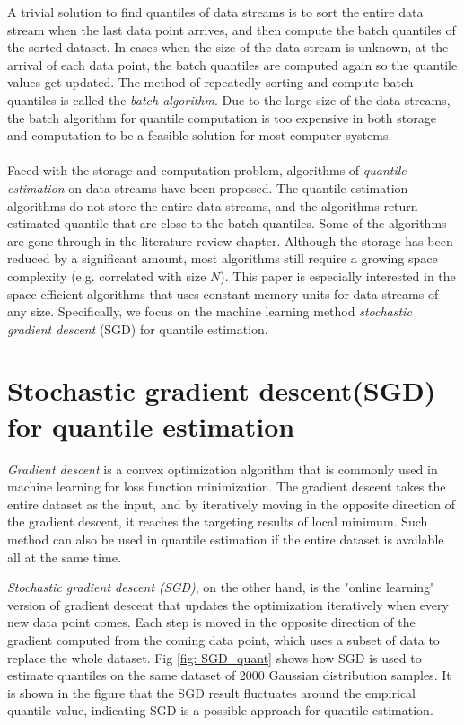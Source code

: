 A trivial solution to find quantiles of data streams is to sort the entire data stream when the last data point arrives, and then compute the batch quantiles of the sorted dataset.  In cases when the size of the data stream is unknown, at the arrival of each data point, the batch quantiles are computed again so the quantile values get updated. The method of repeatedly sorting and compute batch quantiles is called the \textit{batch algorithm}. Due to the large size of the data streams, the batch algorithm for quantile computation is too expensive in both storage and computation to be a feasible solution for most computer systems.
\\\\
Faced with the storage and computation problem, algorithms of \textit{quantile estimation} on data streams have been proposed. The quantile estimation algorithms do not store the entire data streams, and the algorithms return estimated quantile that are close to the batch quantiles. Some of the algorithms are gone through in the literature review chapter. Although the storage has been reduced by a significant amount, most algorithms still require a growing space complexity (e.g. correlated with size $N$). This paper is especially interested in the space-efficient algorithms that uses constant memory units for data streams of any size. Specifically, we focus on the machine learning method \textit{stochastic gradient descent} (SGD) for quantile estimation. 

\section{Stochastic gradient descent(SGD) for quantile estimation}
\label{sec: intro_GD_SGD}

\textit{Gradient descent} is a convex optimization algorithm that is commonly used in machine learning for loss function minimization. The gradient descent takes the entire dataset as the input, and by iteratively moving in the opposite direction of the gradient descent, it reaches the targeting results of local minimum. Such method can also be used in quantile estimation if the entire dataset is available all at the same time.

\textit{Stochastic gradient descent (SGD)}, on the other hand, is the "online learning" version of gradient descent that updates the optimization iteratively when every new data point comes. Each step is moved in the opposite direction of the gradient computed from the coming data point, which uses a subset of data to replace the whole dataset. Fig \ref{fig: SGD_quant} shows how SGD is used to estimate quantiles on the same dataset of 2000 Gaussian distribution samples. It is shown in the figure that the SGD result fluctuates around the empirical quantile value, indicating SGD is a possible approach for quantile estimation.

